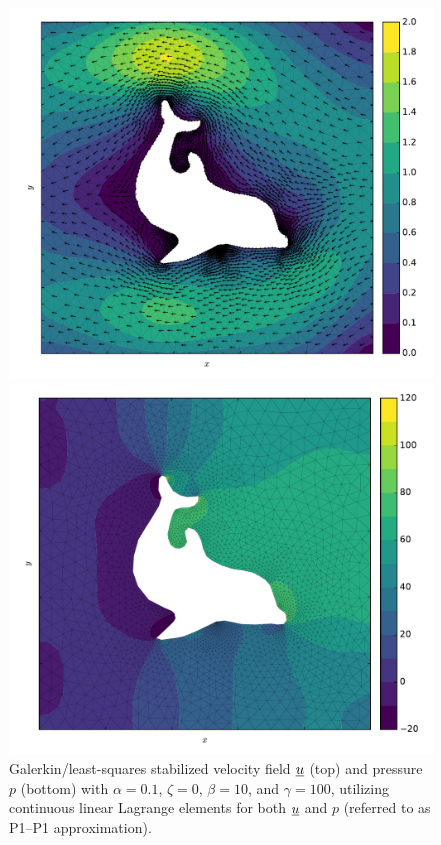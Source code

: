 \begin{figure}
  \centering
  \begin{minipage}[b]{0.60\linewidth}
    \includegraphics[width=\linewidth]{images/fenics_intro/2Dstokes_nitsche_u_stab.pdf}
  \end{minipage}
  \quad
  \begin{minipage}[b]{0.60\linewidth}
    \includegraphics[width=\linewidth]{images/fenics_intro/2Dstokes_nitsche_p_stab.pdf}
  \end{minipage}
  \caption[GLS stabilized slip-friction Stokes example]{Galerkin/least-squares stabilized velocity field $\underline{u}$ (top) and pressure $p$ (bottom) with $\alpha = 0.1$, $\zeta = 0$, $\beta = 10$, and $\gamma = 100$, utilizing continuous linear Lagrange elements for both $\underline{u}$ and $p$ (referred to as P1--P1 approximation).}
  \label{intro_stokes_2d_nitsche_stab}
\end{figure}
